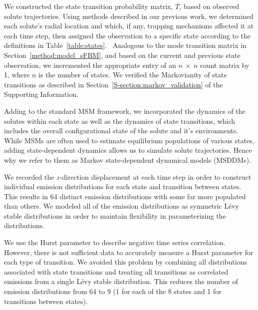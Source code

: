 \documentclass[journal=ancac3,manuscript=article,layout=twocolumn]{achemso}
\begin{document}
  We constructed the state transition probability matrix, $T$, based on
  observed solute trajectories. Using methods described in our previous work,
  we determined each solute's radial location and which, if any, trapping
  mechanisms affected it at each time step, then assigned the observation to a
  specific state according to the definitions in
  Table~\ref{table:states}.~\cite{coscia_chemically_2019} Analogous to the mode
  transition matrix in Section~\ref{method:model_sFBM}, and based on the
  current and previous state observation, we incremented the appropriate entry
  of an $n~\times~n$ count matrix by 1, where $n$ is the number of states. We
  verified the Markovianity of state transitions as described in
  Section~\ref{S-section:markov_validation} of the Supporting Information.
  
  Adding to the standard MSM framework, we incorporated the dynamics of the
  solutes within each state as well as the dynamics of state transitions, which
  includes the overall configurational state of the solute and it's
  environments. While MSMs are often used to estimate equilibrium populations
  of various states, adding state-dependent dynamics allows us to simulate
  solute trajectories. Hence why we refer to them as Markov state-dependent
  dynamical models (MSDDMs). 
  
  We recorded the $z$-direction displacement at each time step in order to
  construct individual emission distributions for each state and transition
  between states. This results in 64 distinct emission distributions with some
  far more populated than others. We modeled all of the emission distributions
  as symmetric L\'evy stable distributions in order to maintain flexibility in
  parameterizing the distributions.
  
  We use the Hurst parameter to describe negative time series correlation.
  However, there is not sufficient data to accurately measure a Hurst parameter
  for each type of transition. We avoided this problem by combining all
  distributions associated with state transitions and treating all transitions
  as correlated emissions from a single L\'evy stable distribution. This
  reduces the number of emission distributions from 64 to 9 (1 for each of the
  8 states and 1 for transitions between states).  
  
\end{document}
